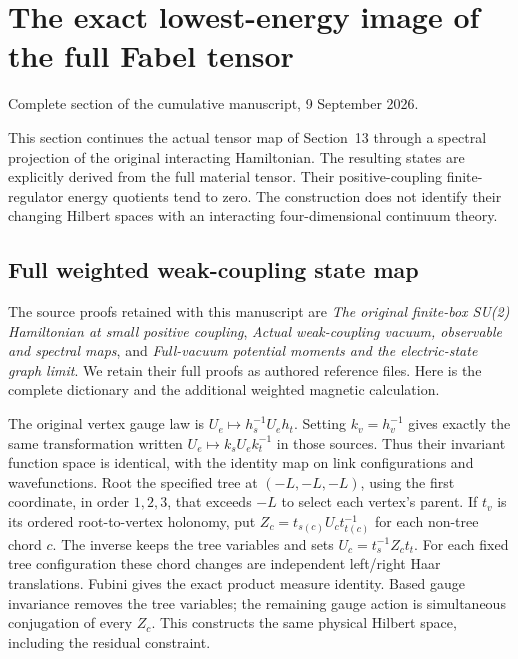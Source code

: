 \section{The exact lowest-energy image of the full Fabel
tensor}\label{fabel-low-mode-transfer-md-the-exact-lowest-energy-image-of-the-full-fabel-tensor}

Complete section of the cumulative manuscript, 9 September 2026.

This section continues the actual tensor map of Section~13 through a
spectral projection of the original interacting Hamiltonian. The
resulting states are explicitly derived from the full material tensor.
Their positive-coupling finite-regulator energy quotients tend to zero.
The construction does not identify their changing Hilbert spaces with an
interacting four-dimensional continuum theory.

\subsection{Full weighted weak-coupling state
map}\label{fabel-low-mode-transfer-md-full-weighted-weak-coupling-state-map}

The source proofs retained with this manuscript are \emph{The original
finite-box SU(2) Hamiltonian at small positive coupling}, \emph{Actual
weak-coupling vacuum, observable and spectral maps}, and
\emph{Full-vacuum potential moments and the electric-state graph limit}.
We retain their full proofs as authored reference files. Here is the
complete dictionary and the additional weighted magnetic calculation.

The original vertex gauge law is \(U_e\mapsto h_s^{-1}U_eh_t\). Setting
\(k_v=h_v^{-1}\) gives exactly the same transformation written
\(U_e\mapsto k_sU_ek_t^{-1}\) in those sources. Thus their invariant
function space is identical, with the identity map on link
configurations and wavefunctions. Root the specified tree at
\((-L,-L,-L)\), using the first coordinate, in order \(1,2,3\), that
exceeds \(-L\) to select each vertex's parent. If \(t_v\) is its ordered
root-to-vertex holonomy, put \(Z_c=t_{s(c)}U_ct_{t(c)}^{-1}\) for each
non-tree chord \(c\). The inverse keeps the tree variables and sets
\(U_c=t_s^{-1}Z_ct_t\). For each fixed tree configuration these chord
changes are independent left/right Haar translations. Fubini gives the
exact product measure identity. Based gauge invariance removes the tree
variables; the remaining gauge action is simultaneous conjugation of
every \(Z_c\). This constructs the same physical Hilbert space,
including the residual constraint.

